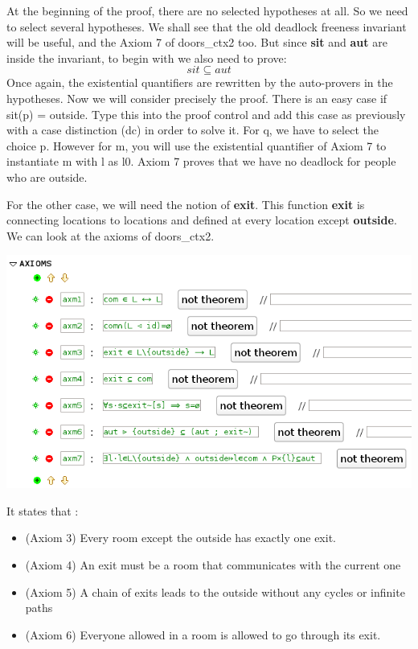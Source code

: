 At the beginning of the proof, there are no selected hypotheses at all. So we need to select several hypotheses. We shall see that the old deadlock freeness invariant will be useful, and the Axiom 7 of doors\_ctx2 too. But since \textbf{sit} and \textbf{aut} are inside the invariant, to begin with we also need to prove:
\[
sit \subseteq aut
\]
Once again, the existential quantifiers are rewritten by the auto-provers in the hypotheses. Now we will consider precisely the proof. There is an easy case if sit(p) = outside. Type this into the proof control and add this case as previously with a case distinction (dc) in order to solve it. For q, we have to select the choice p. However for m, you will use the existential quantifier of Axiom 7 to instantiate m with l as l0. 
Axiom 7 proves that we have no deadlock for people who are outside.

For the other case, we will need the notion of \textbf{exit}. This function \textbf{exit} is connecting locations to locations and defined at every location except \textbf{outside}. 
We can look at the axioms of doors\_ctx2. 
\begin{center}
	\includegraphics[]{img/tutorial/tut_10_axioms.png}
\end{center}

It states that :

\begin{itemize}
	\item (Axiom 3) Every room except the outside has exactly one exit. 
	\item (Axiom 4) An exit must be a room that communicates with the current one
	\item (Axiom 5) A chain of exits leads to the outside without any cycles or infinite paths
	\item (Axiom 6) Everyone allowed in a room is allowed to go through its exit. 
\end{itemize}  

